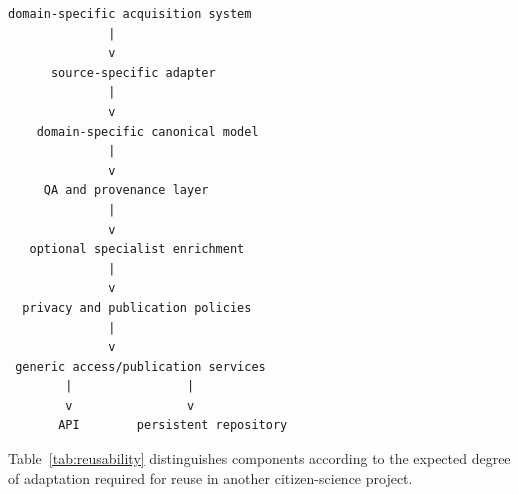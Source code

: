 \begin{verbatim}
domain-specific acquisition system
              |
              v
      source-specific adapter
              |
              v
    domain-specific canonical model
              |
              v
     QA and provenance layer
              |
              v
   optional specialist enrichment
              |
              v
  privacy and publication policies
              |
              v
 generic access/publication services
        |                |
        v                v
       API        persistent repository
\end{verbatim}

Table~\ref{tab:reusability} distinguishes components according to the expected degree of adaptation required for reuse in another citizen-science project.


